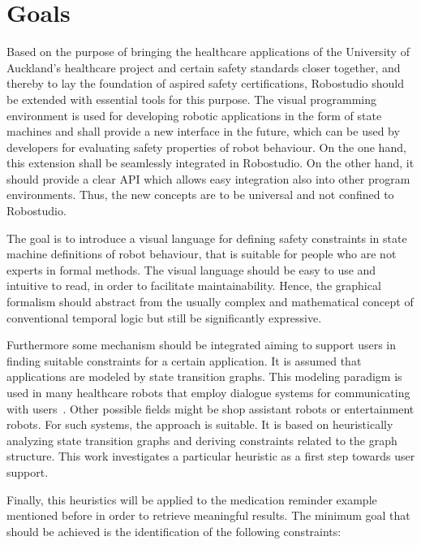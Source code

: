 \chapter{Goals}
\label{chap:goals}


Based on the purpose of bringing the healthcare applications of the University of Auckland's healthcare project and certain safety standards closer together, and thereby to lay the foundation of aspired safety certifications, Robostudio should be extended with essential tools for this purpose. The visual programming environment is used for developing robotic applications in the form of state machines and shall provide a new interface in the future, which can be used by developers for evaluating safety properties of robot behaviour. On the one hand, this extension shall be seamlessly integrated in Robostudio. On the other hand, it should provide a clear API which allows easy integration also into other program environments. Thus, the new concepts are to be universal and not confined to Robostudio.

The goal is to introduce a visual language for defining safety constraints in state machine definitions of robot behaviour, that is suitable for people who are not experts in formal methods. The visual language should be easy to use and intuitive to read, in order to facilitate maintainability.
Hence, the graphical formalism should abstract from the usually complex and mathematical concept of conventional temporal logic but still be significantly expressive.
 
Furthermore some mechanism should be integrated aiming to support users in finding suitable constraints for a certain application. It is assumed that applications are modeled by state transition graphs. This modeling paradigm is used in many healthcare robots that employ dialogue systems for communicating with users~\cite{Bickmore2006}. Other possible fields might be shop assistant robots or entertainment robots. For such systems, the approach is suitable. It is based on heuristically analyzing state transition graphs and deriving constraints related to the graph structure. This work investigates a particular heuristic as a first step towards user support. 

Finally, this heuristics will be applied to the medication reminder example mentioned before in order to retrieve meaningful results. The minimum goal that should be achieved is the identification of the following constraints:

